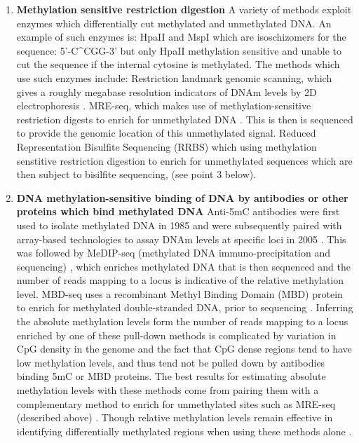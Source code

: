 \documentclass[
]{book}
\begin{document}
\begin{enumerate}
\def\labelenumi{\arabic{enumi}.}
\item
  \textbf{Methylation sensitive restriction digestion}
  A variety of methods exploit enzymes which differentially cut methylated and unmethylated DNA. An example of such enzymes is: HpaII and MspI which are isoschizomers for the sequence: 5'-C\^{}CGG-3' but only HpaII methylation sensitive and unable to cut the sequence if the internal cytosine is methylated. The methods which use such enzymes include: Restriction landmark genomic scanning, which gives a roughly megabase resolution indicators of DNAm levels by 2D electrophoresis \citep{Hatada1991}. MRE-seq, which makes use of methylation-sensitive restriction digests to enrich for unmethylated DNA \citep{Maunakea2010}. This is then is sequenced to provide the genomic location of this unmethylated signal. Reduced Representation Bisulfite Sequencing (RRBS) which using methylation senstitive restriction digestion to enrich for unmethylated sequences which are then subject to bisilfite sequencing, (see point 3 below).
\item
  \textbf{DNA methylation-sensitive binding of DNA by antibodies or other proteins which bind methylated DNA}
  Anti-5mC antibodies were first used to isolate methylated DNA in 1985 and were subsequently paired with array-based technologies to assay DNAm levels at specific loci in 2005 \citep[\citet{Harrison2011}]{Weber2005}. This was followed by MeDIP-seq (methylated DNA immuno-precipitation and sequencing) \citep[\citet{Lienhard2014}]{Down2009}, which enriches methylated DNA that is then sequenced and the number of reads mapping to a locus is indicative of the relative methylation level. MBD-seq uses a recombinant Methyl Binding Domain (MBD) protein to enrich for methylated double-stranded DNA, prior to sequencing \citep{Serre2009a}. Inferring the absolute methylation levels form the number of reads mapping to a locus enriched by one of these pull-down methods is complicated by variation in CpG density in the genome and the fact that CpG dense regions tend to have low methylation levels, and thus tend not be pulled down by antibodies binding 5mC or MBD proteins. The best results for estimating absolute methylation levels with these methods come from pairing them with a complementary method to enrich for unmethylated sites such as MRE-seq (described above) \citep{Li2015}. Though relative methylation levels remain effective in identifying differentially methylated regions when using these methods alone \citep[\citet{Maunakea2010}]{Bock2010}.

\end{enumerate}
\end{document}
